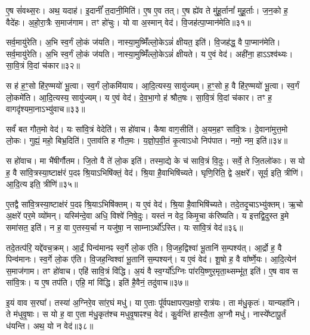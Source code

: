    ए॒ष सं॑वथ्स॒रः।
   अथ॒ यदाह॑।
   इ॒दानीं᳚ त॒दानी॒मिति॑।
   ए॒ष ए॒व तत्।
   ए॒ष ह्ये॑व ते मु॑हू॒र्तानां᳚ मुहू॒र्ताः।
    ज॒न॒को ह॒ वैदे॑हः।
   अ॒हो॒रा॒त्रैः स॒माज॑गाम।
   तꣳ हो॑चुः।
   यो वा अ॒स्मान् वेद॑।
   वि॒जह॑त्पा॒प्मान॑मेति॥३१॥

   सर्व॒मायु॑रेति।
   अ॒भि स्व॒र्गं लो॒कं ज॑यति।
   नास्या॒मुष्मिँ॑ल्लो॒के\-ऽन्नं॑ क्षीयत॒ इति॑।
   वि॒जह॑द्ध॒ वै पा॒प्मान॑मेति।
   सर्व॒मायु॑रेति।
   अ॒भि स्व॒र्गं लो॒कं ज॑यति।
   नास्या॒मुष्मिँ॑ल्लो॒केऽन्नं॑ क्षीयते।
   य ए॒वं वेद॑।
   अही॑ना॒ हाऽऽश्व॑थ्यः।
   सा॒वि॒त्रं वि॒दां च॑कार॥३२॥

   स ह॑ ह॒ꣳ॒सो हि॑र॒ण्मयो॑ भू॒त्वा।
   स्व॒र्गं लो॒कमि॑याय।
   आ॒दि॒त्यस्य॒ सायु॑ज्यम्।
   ह॒ꣳ॒सो ह॒ वै हि॑र॒ण्मयो॑ भू॒त्वा।
   स्व॒र्गं लो॒कमे॑ति।
   आ॒दि॒त्यस्य॒ सायु॑ज्यम्।
   य ए॒वं वेद॑।
   दे॒व॒भा॒गो ह॑ श्रौत॒षः।
   सा॒वि॒त्रं वि॒दां च॑कार।
   तꣳ ह॒ वागदृ॑श्यमा॒नाऽभ्यु॑वाच॥३३॥

   सर्वं॑ बत गौत॒मो वेद॑।
   यः सा॑वि॒त्रं वेदेति॑।
   स हो॑वाच।
   कैषा वाग॒सीति॑।
   अ॒यम॒हꣳ सा॑वि॒त्रः।
   दे॒वाना॑मुत्त॒मो लो॒कः।
   गुह्यं॒ महो॒ बिभ्र॒दिति॑।
   ए॒ताव॑ति ह गौत॒मः।
   य॒ज्ञो॒प॒वी॒तं कृ॒त्वाऽधो निप॑पात।
   नमो॒ नम॒ इति॑॥३४॥

   स हो॑वाच।
   मा भै॑षीर्गौतम।
   जि॒तो वै ते॑ लो॒क इति॑।
   तस्मा॒द्ये के च॑ सावि॒त्रं वि॒दुः।
   सर्वे॒ ते जि॒तलो॑काः।
   स यो ह॒ वै सा॑वि॒त्रस्या॒ष्टाक्ष॑रं प॒दꣴ श्रि॒याऽभिषि॑क्तं॒ वेद॑।
   श्रि॒या है॒वाभिषि॑च्यते।
   घृणि॒रिति॒ द्वे अ॒क्षरे᳚।
   सूर्य॒ इति॒ त्रीणि॑।
   आ॒दि॒त्य इति॒ त्रीणि॑॥३५॥

   ए॒तद्वै सा॑वि॒त्रस्या॒ष्टाक्ष॑रं प॒दꣴ श्रि॒याऽभिषि॑क्तम्।
   य ए॒वं वेद॑।
   श्रि॒या है॒वाभिषि॑च्यते।
   तदे॒तदृ॒चाऽभ्यु॑क्तम्।
   ऋ॒चो अ॒क्षरे॑ पर॒मे व्यो॑मन्।
   यस्मि॑न्दे॒वा अधि॒ विश्वे॑ निषे॒दुः।
   यस्तं न वेद॒ किमृ॒चा क॑रिष्यति।
   य इत्तद्वि॒दुस्त इ॒मे समा॑सत॒ इति॑।
   न ह॒ वा ए॒तस्य॒र्चा न यजु॑षा॒ न साम्नाऽर्थो᳚ऽस्ति।
   यः सा॑वि॒त्रं वेद॑॥३६॥

   तदे॒तत्प॑रि॒ यद्दे॑वच॒क्रम्।
   आ॒र्द्रं पिन्व॑मानꣴ स्व॒र्गे लो॒क ए॑ति।
   वि॒जह॒द्विश्वा॑ भू॒तानि॑ स॒म्पश्य॑त्।
   आ॒र्द्रो ह॒ वै पिन्व॑मानः।
   स्व॒र्गे लो॒क ए॑ति।
   वि॒जह॒न्विश्वा॑ भू॒तानि॑ स॒म्पश्यन्॑।
   य ए॒वं वेद॑।
   शू॒षो ह॒ वै वा᳚र्ष्णे॒यः।
   आ॒दि॒त्येन॑ स॒माज॑गाम।
   तꣳ हो॑वाच।
   एहि॑ सावि॒त्रं वि॑द्धि।
   अ॒यं वै स्व॒र्ग्यो᳚ऽग्निः पा॑रयि॒ष्णुर॒मृता॒थ्सम्भू॑त॒ इति॑।
   ए॒ष वाव स सा॑वि॒त्रः।
   य ए॒ष तप॑ति।
   एहि॒ मां वि॑द्धि।
   इति॑ है॒वैनं॒ तदु॑वाच॥३७॥
   \anuvakamend

   इ॒यं वाव स॒रघा᳚।
   तस्या॑ अ॒ग्निरे॒व सा॑र॒घं मधु॑।
   या ए॒ताः पू᳚र्वपक्षापरप॒क्षयो॒ रात्र॑यः।
   ता म॑धु॒कृतः॑।
   यान्यहा॑नि।
   ते म॑धुवृ॒षाः।
   स यो ह॒ वा ए॒ता म॑धु॒कृत॑श्च मधुवृ॒षाꣴश्च॒ वेद॑।
   कु॒र्वन्ति॑ हास्यै॒ता अ॒ग्नौ मधु॑।
   नास्ये᳚ष्टापू॒र्तं ध॑यन्ति।
   अथ॒ यो न वेद॑॥३८॥

